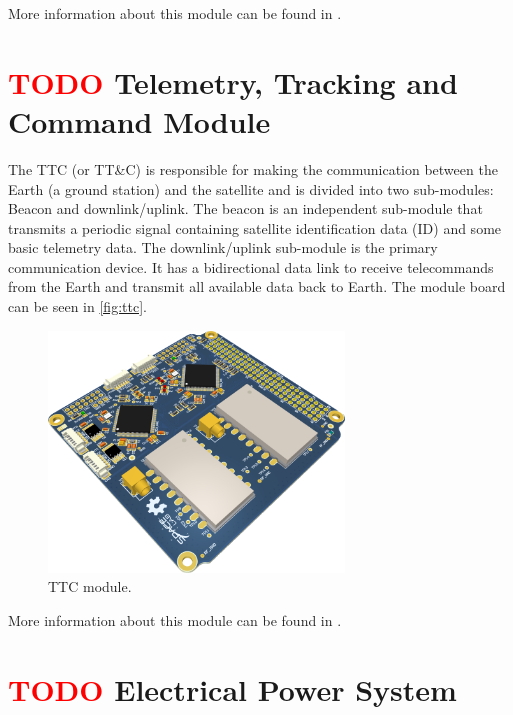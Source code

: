 More information about this module can be found in \cite{obdh2}.

\section{ \textcolor{red}{TODO} Telemetry, Tracking and Command Module}

The TTC (or TT\&C) is responsible for making the communication between the Earth (a ground station) and the satellite and is divided into two sub-modules: Beacon and downlink/uplink. The beacon is an independent sub-module that transmits a periodic signal containing satellite identification data (ID) and some basic telemetry data. The downlink/uplink sub-module is the primary communication device. It has a bidirectional data link to receive telecommands from the Earth and transmit all available data back to Earth. The module board can be seen in \autoref{fig:ttc}.

\begin{figure}[!ht]
    \begin{center}
        \includegraphics[width=0.7\textwidth]{figures/subsystems/ttc2_pcb_3d}
        \caption{TTC module.}
        \label{fig:ttc}
    \end{center}
\end{figure}

More information about this module can be found in \cite{ttc}.


\section{ \textcolor{red}{TODO} Electrical Power System}

